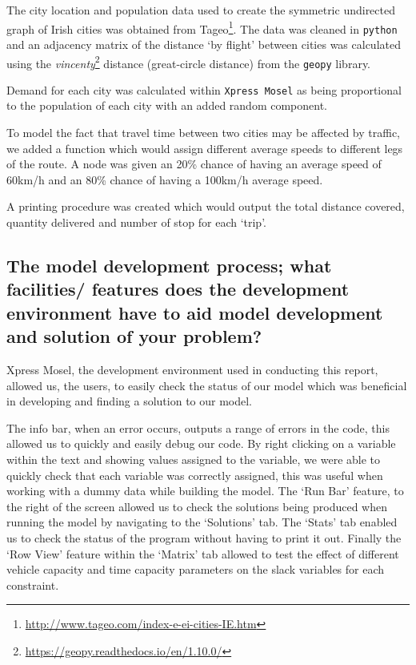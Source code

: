 \documentclass[a4paper,11pt]{article}
\begin{document}
The city location and population data used to create the symmetric undirected graph of Irish cities was obtained from Tageo\footnote{\url{http://www.tageo.com/index-e-ei-cities-IE.htm}}. The data was cleaned in \texttt{python} and an adjacency matrix of the distance `by flight' between cities was calculated using the \textit{vincenty}\footnote{\url{https://geopy.readthedocs.io/en/1.10.0/}} distance (great-circle distance) from the \texttt{geopy} library.

Demand for each city was calculated within \texttt{Xpress Mosel} as being proportional to the population of each city with an added random component. 

To model the fact that travel time between two cities may be affected by traffic, we added a function which would assign different average speeds to different legs of the route. A node was given an 20\% chance of having an average speed of 60km/h and an 80\% chance of having a 100km/h average speed.

A printing procedure was created which would output the total distance covered, quantity delivered and number of stop for each `trip'.




\subsection{The model development process; what facilities/ features does the development environment
have to aid model development and solution of your problem? }

Xpress Mosel, the development environment used in conducting this report, allowed us, the users, to easily check the status of our model which was beneficial in developing and finding a solution to our model. 

The info bar, when an error occurs, outputs a range of errors in the code, this allowed us to quickly and easily debug our code. By right clicking on a variable within the text and showing values assigned to the variable, we were able to quickly check that each variable was correctly assigned, this was useful when working with a dummy data while building the model.
The `Run Bar' feature, to the right of the screen allowed us to check the solutions being produced when running the model by navigating to the `Solutions' tab. The `Stats' tab enabled us to check the status of the program without having to print it out. Finally the `Row View' feature within the `Matrix' tab allowed to test the effect of different vehicle capacity and time capacity parameters on the slack variables for each constraint.
\end{document}
